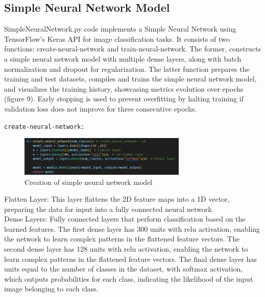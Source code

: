 \documentclass{article}
\newcommand{\code}[1]{\colorbox{light-gray}{\texttt{#1}}}
\begin{document}
\newpage
\subsection{Simple Neural Network Model}
SimpleNeuralNetwork.py code implements a Simple Neural Network using TensorFlow's Keras API for image classification tasks.
It consists of two functions: create-neural-network and train-neural-network.
The former, constructs a simple neural network model with multiple dense layers, along with batch normalization and dropout for regularization. The latter function prepares the training and test datasets, compiles and trains the simple neural network model, and visualizes the training history, showcasing metrics evolution over epochs (figure 9). Early stopping is used to prevent overfitting by halting training if validation loss does not improve for three consecutive epochs.\\\newline

\code{create-neural-network:}\\\newline
\begin{figure}[H]
    \caption{Creation of simple neural network model}
    \centering
    \includegraphics[width=8cm]{../imgFolder/create-neural-network-code.png}
\end{figure}

Flatten Layer: This layer flattens the 2D feature maps into a 1D vector,
preparing the data for input into a fully connected neural network.\\\newline
Dense Layers: Fully connected layers that perform classification based on the learned features.
The first dense layer has 300 units with relu activation, enabling the network to learn complex
patterns in the flattened feature vectors.
The second dense layer has 128 units with relu activation, enabling the network to learn complex
patterns in the flattened feature vectors.
The final dense layer has units equal to the number of classes
in the dataset, with softmax activation, which outputs probabilities for each class,
indicating the likelihood of the input image belonging to each class.\\\newline
\end{document}
